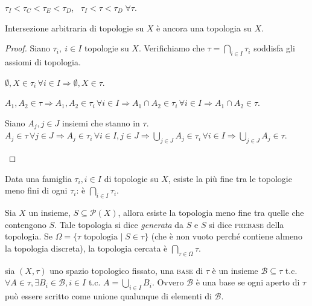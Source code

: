 \documentclass{article}
\begin{document}
\begin{ex}
	$\tau_I < \tau_C < \tau_E < \tau_D$, \, $\tau_I < \tau < \tau_D \; \forall
	\tau$.
\end{ex}

\begin{lm}
	Intersezione arbitraria di topologie su $X$ è ancora una topologia su $X$.
\end{lm}

\begin{proof}
Siano $\tau_i,\ i \in I$ topologie su $X$.
Verifichiamo che $ \tau=\bigcap_{i \in I} \tau_i$ soddisfa gli assiomi di
topologia.

\begin{nlist}
\item $\emptyset, X \in \tau_i \, \forall i \in I \Rightarrow \emptyset, X \in
\tau$.
\item $A_1, A_2 \in \tau \Rightarrow A_1, A_2 \in \tau_i \, \forall i
\in I \Rightarrow A_1 \cap A_2 \in \tau_i \, \forall i \in I \Rightarrow A_1
\cap A_2 \in \tau$.
\item Siano $A_j, j \in J$ insiemi che stanno in $\tau$. \\
$\displaystyle A_j \in \tau \, \forall j \in J \Rightarrow A_j \in \tau_i \,
\forall i \in I, j \in J \Rightarrow {\bigcup_{j \in J} A_j \in \tau_i \,
\forall i \in I} \Rightarrow {\bigcup_{j \in J} A_j \in \tau}$.
\end{nlist}
\end{proof}

\begin{cor}
	Data una famiglia $\tau_i, i \in I$ di topologie su $X$, esiste la più fine
	tra le topologie meno fini di ogni $\tau_i$: è $\displaystyle \bigcap_{i \in
	I} \tau_i$.
\end{cor}

\begin{cor}
	Sia $X$ un insieme, $S \subseteq \mathcal{P}(X)$, allora esiste la topologia
	meno fine tra quelle che contengono $S$. Tale topologia si dice
	\textit{generata} da $S$ e $S$ si dice \textsc{prebase} della topologia. Se
	$\Omega= \{ \tau \text{ topologia } |\; S \in \tau \}$ (che è non vuoto
	perché contiene almeno la topologia discreta), la topologia cercata è
	$\displaystyle \bigcap_{\tau \in \Omega} \tau$.
\end{cor}

\begin{defn}
	sia $(X, \tau)$ uno spazio topologico fissato, una \textsc{base} di $\tau$ è
	un insieme $\mathcal{B} \subseteq \tau$ t.c. $\forall A \in \tau, \exists
	B_i \in \mathcal{B}, i \in I$ t.c. $A= \bigcup_{i \in I} B_i$. Ovvero
	$\mathcal{B}$ \`e una base se ogni aperto di $\tau$ pu\`o essere scritto
	come unione qualunque di elementi di $\mathcal{B}$.
\end{defn}
\end{document}
